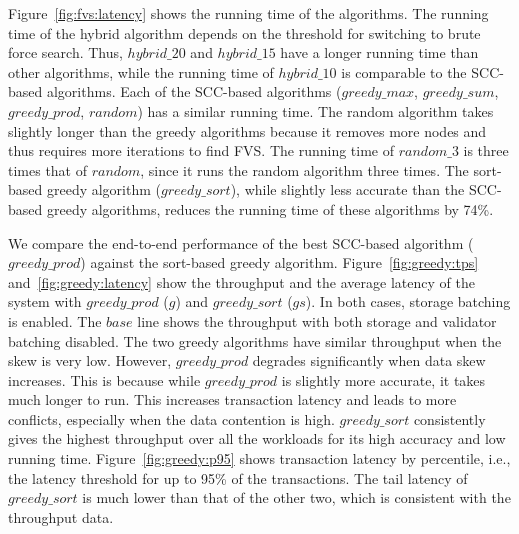 Figure~\ref{fig:fvs:latency} shows the running time of the algorithms. The running time of the hybrid algorithm depends on the threshold for switching to brute force search. Thus, $hybrid\_20$ and $hybrid\_15$ have a longer running time than other algorithms, while the running time of $hybrid\_10$ is comparable to the SCC-based algorithms. Each of the SCC-based algorithms ($greedy\_max$, $greedy\_sum$, $greedy\_prod$, $random$) has a similar running time. The random algorithm takes slightly longer than the greedy algorithms because it removes more nodes and thus requires more iterations to find FVS. The running time of $random\_3$ is three times that of $random$, since it runs the random algorithm three times. The sort-based greedy algorithm ($greedy\_sort$), while slightly less accurate than the SCC-based greedy algorithms, reduces the running time of these algorithms by 74\%. 

We compare the end-to-end performance of the best SCC-based algorithm ($greedy\_prod$) against the sort-based greedy algorithm. Figure~\ref{fig:greedy:tps} and~\ref{fig:greedy:latency} show the  throughput and the average latency of the system with $greedy\_prod$ ($g$) and $greedy\_sort$ ($gs$). In both cases, storage batching is enabled. The $base$ line shows the throughput with both storage and validator batching disabled. 
The two greedy algorithms have similar throughput when the skew is very low. However, $greedy\_prod$ degrades significantly when data skew increases. This is because while $greedy\_prod$ is slightly more accurate, it takes much longer to run. This increases transaction latency and leads to more conflicts, especially when the data contention is high. $greedy\_sort$ consistently gives the highest throughput over all the workloads for its high accuracy and low running time. 
Figure~\ref{fig:greedy:p95} shows transaction latency by percentile, i.e., the latency threshold for up to 95\% of the transactions. The tail latency of $greedy\_sort$ is much lower than that of the other two, which is consistent with the throughput data.

